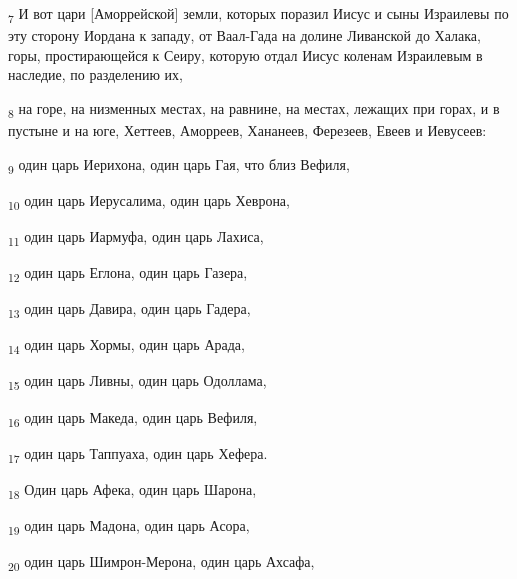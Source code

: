 \begin{tcolorbox}
\textsubscript{7} И вот цари [Аморрейской] земли, которых поразил Иисус и сыны Израилевы по эту сторону Иордана к западу, от Ваал-Гада на долине Ливанской до Халака, горы, простирающейся к Сеиру, которую отдал Иисус коленам Израилевым в наследие, по разделению их,
\end{tcolorbox}
\begin{tcolorbox}
\textsubscript{8} на горе, на низменных местах, на равнине, на местах, лежащих при горах, и в пустыне и на юге, Хеттеев, Аморреев, Хананеев, Ферезеев, Евеев и Иевусеев:
\end{tcolorbox}
\begin{tcolorbox}
\textsubscript{9} один царь Иерихона, один царь Гая, что близ Вефиля,
\end{tcolorbox}
\begin{tcolorbox}
\textsubscript{10} один царь Иерусалима, один царь Хеврона,
\end{tcolorbox}
\begin{tcolorbox}
\textsubscript{11} один царь Иармуфа, один царь Лахиса,
\end{tcolorbox}
\begin{tcolorbox}
\textsubscript{12} один царь Еглона, один царь Газера,
\end{tcolorbox}
\begin{tcolorbox}
\textsubscript{13} один царь Давира, один царь Гадера,
\end{tcolorbox}
\begin{tcolorbox}
\textsubscript{14} один царь Хормы, один царь Арада,
\end{tcolorbox}
\begin{tcolorbox}
\textsubscript{15} один царь Ливны, один царь Одоллама,
\end{tcolorbox}
\begin{tcolorbox}
\textsubscript{16} один царь Македа, один царь Вефиля,
\end{tcolorbox}
\begin{tcolorbox}
\textsubscript{17} один царь Таппуаха, один царь Хефера.
\end{tcolorbox}
\begin{tcolorbox}
\textsubscript{18} Один царь Афека, один царь Шарона,
\end{tcolorbox}
\begin{tcolorbox}
\textsubscript{19} один царь Мадона, один царь Асора,
\end{tcolorbox}
\begin{tcolorbox}
\textsubscript{20} один царь Шимрон-Мерона, один царь Ахсафа,
\end{tcolorbox}
